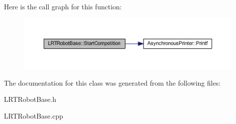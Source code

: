 \-Here is the call graph for this function\-:\nopagebreak
\begin{figure}[H]
\begin{center}
\leavevmode
\includegraphics[width=350pt]{class_l_r_t_robot_base_a242e46650b04f58baaa6c3c585a15634_cgraph}
\end{center}
\end{figure}




\-The documentation for this class was generated from the following files\-:\begin{DoxyCompactItemize}
\item 
\-L\-R\-T\-Robot\-Base.\-h\item 
\-L\-R\-T\-Robot\-Base.\-cpp\end{DoxyCompactItemize}
